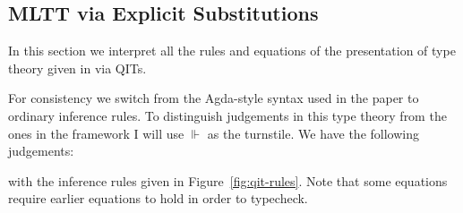 \documentclass[10pt]{article}
\theoremstyle{definition}
\newcommand{\CTX}{\,\,\mathsf{Ctx}}
\newcommand{\TYPE}{\,\,\mathsf{Type}}
\begin{document}
\subsection{MLTT via Explicit Substitutions}
\newcommand{\qyields}{\Vdash}
\newcommand{\varsof}[1]{{#1}^\dagger}
\newcommand{\upstairs}[1]{\overline{#1}}
\newcommand{\downstairs}[1]{\underline{#1}}
\newcommand{\asdep}[1]{{#1}_p}

In this section we interpret all the rules and equations of the presentation of type theory given in \cite{altenkirchkaposi16qit} via QITs. 

For consistency we switch from the Agda-style syntax used in the paper to ordinary inference rules. To distinguish judgements in this type theory from the ones in the framework I will use $\qyields$ as the turnstile.  We have the following judgements:
with the inference rules given in Figure~\ref{fig:qit-rules}. Note that some equations require earlier equations to hold in order to typecheck.
\end{document}
